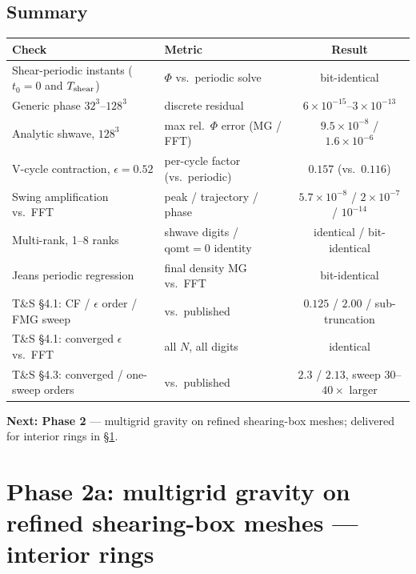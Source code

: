 \documentclass[11pt]{article}
\begin{document}
\subsection{Summary}
\begin{center}
\small
\begin{tabular}{@{}llc@{}}
\toprule
Check & Metric & Result \\
\midrule
Shear-periodic instants ($t_0=0$ and $T_{\rm shear}$) & $\Phi$ vs.\ periodic solve & bit-identical \\
Generic phase $32^3$--$128^3$ & discrete residual & $6\times10^{-15}$--$3\times10^{-13}$ \\
Analytic shwave, $128^3$ & max rel.\ $\Phi$ error (MG / FFT) & $9.5\times10^{-8}$ / $1.6\times10^{-6}$ \\
V-cycle contraction, $\epsilon=0.52$ & per-cycle factor (vs.\ periodic) & $0.157$ (vs.\ $0.116$) \\
Swing amplification vs.\ FFT & peak / trajectory / phase & $5.7\times10^{-8}$ / $2\times10^{-7}$ / $10^{-14}$ \\
Multi-rank, 1--8 ranks & shwave digits / $\mathrm{qomt}{=}0$ identity & identical / bit-identical \\
Jeans periodic regression & final density MG vs.\ FFT & bit-identical \\
\midrule
T\&S \S4.1: CF / $\epsilon$ order / FMG sweep & vs.\ published & $0.125$ / $2.00$ / sub-truncation \\
T\&S \S4.1: converged $\epsilon$ vs.\ FFT & all $N$, all digits & identical \\
T\&S \S4.3: converged / one-sweep orders & vs.\ published & $2.3$ / $2.13$, sweep $30$--$40\times$ larger \\
\bottomrule
\end{tabular}
\end{center}

\noindent\textbf{Next: Phase 2} --- multigrid gravity on refined shearing-box meshes;
delivered for interior rings in \S\ref{sec:phase2a}.

\section{Phase 2a: multigrid gravity on refined shearing-box meshes ---
         interior rings}
\label{sec:phase2a}
\end{document}
